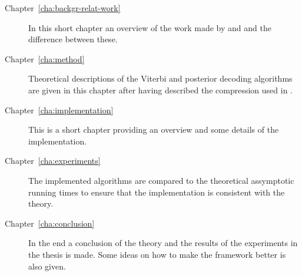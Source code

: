 \begin{description}
\item[Chapter~\ref{cha:backgr-relat-work}] In this short chapter an overview of
  the work made by \citet{lifshits2009speeding} and \citet{sand2013ziphmmlib}
  and the difference between these.
\item[Chapter~\ref{cha:method}] Theoretical descriptions of the Viterbi and
  posterior decoding algorithms are given in this chapter after having
  described the compression used in \citet{sand2013ziphmmlib}.
\item[Chapter~\ref{cha:implementation}] This is a short chapter providing an
  overview and some details of the implementation.
\item[Chapter~\ref{cha:experiments}] The implemented algorithms are compared to
  the theoretical assymptotic running times to ensure that the implementation
  is consistent with the theory.
\item[Chapter~\ref{cha:conclusion}] In the end a conclusion of the theory and
  the results of the experiments in the thesis is made. Some ideas on how to
  make the framework better is also given.
\end{description}

